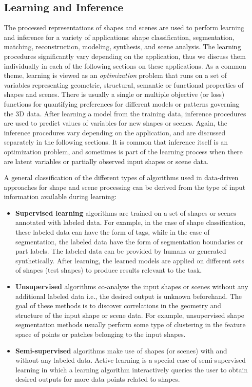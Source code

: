 \subsection{Learning and Inference}
The processed representations of shapes and scenes are used to perform learning and inference for a variety of applications: shape classification, segmentation, matching, reconstruction, modeling, synthesis, and scene analysis. The learning procedures significantly vary depending on the application, thus we discuss them individually in each of the following sections on these applications. As a common theme, learning is viewed as an \emph{optimization} problem that runs on a set of variables representing geometric, structural, semantic or functional properties of shapes and scenes. There is usually a single or multiple objective (or loss) functions for quantifying preferences for different models or patterns governing the 3D data. After learning a model from the training data, inference procedures are used to predict values of variables for new shapes or scenes. Again, the inference procedures vary depending on the application, and are discussed separately in the following sections. It is common that inference itself is an optimization problem, and sometimes is part of the learning process when there are latent variables or partially observed input shapes or scene data.

A general classification of the different types of algorithms used in data-driven approaches for shape and scene processing can be derived from the type of input information available during learning:

\begin{itemize}
\item \textbf{Supervised learning} algorithms are trained on a set of shapes or scenes annotated with labeled data. For example, in the case of shape classification, these labeled data can have the form of tags, while in the case of segmentation, the labeled data have the form of segmentation boundaries or part labels. The labeled data can be provided by humans or generated synthetically. After learning, the learned models are applied on different sets of shapes (test shapes) to produce results relevant to the task.
\item \textbf{Unsupervised} algorithms co-analyze the input shapes or scenes without any additional labeled data i.e., the desired output is unknown beforehand. The goal of these methods is to discover correlations in the geometry and structure of the input shape or scene data. For example, unsupervised shape segmentation methods usually perform some type of clustering in the feature space of points or patches belonging to the input shapes.
\item \textbf{Semi-supervised} algorithms make use of shapes (or scenes) with and without any labeled data. Active learning is a special case of semi-supervised learning in which a learning algorithm interactively queries the user to obtain desired outputs for more data points related to shapes.
\end{itemize}

